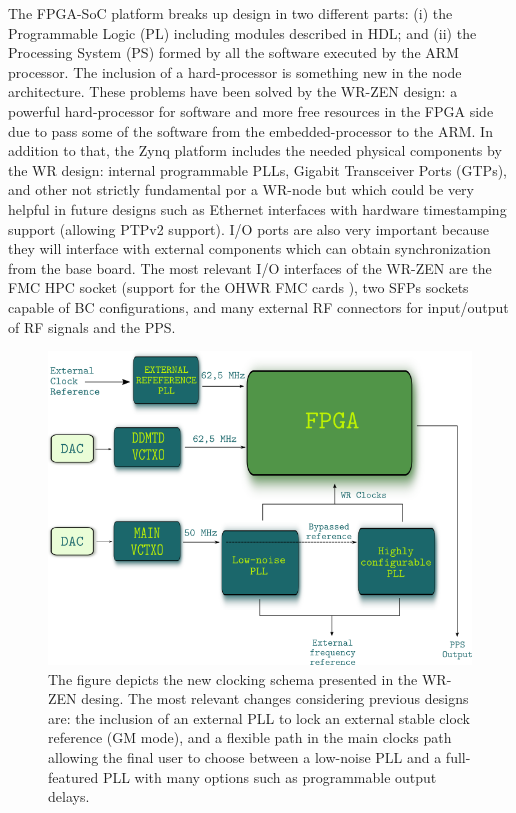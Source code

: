 The FPGA-SoC platform breaks up design in two different parts: (i) the 
Programmable Logic (PL) including modules described in HDL; and (ii) the 
Processing System (PS) formed by all the software executed by the ARM processor.
The inclusion of a hard-processor is something new in the node architecture.
These problems have been solved by the WR-ZEN design: a 
powerful hard-processor for software and more free resources in the FPGA side 
due to pass some of the software from the embedded-processor to the ARM. In 
addition to that, the Zynq platform includes the needed physical components by 
the WR design: internal programmable PLLs, Gigabit Transceiver Ports (GTPs), 
and other not strictly fundamental por a WR-node but which could be very 
helpful in future designs such as Ethernet interfaces with hardware timestamping 
support (allowing PTPv2 support). I/O ports are also very important because 
they will interface with external components which can obtain synchronization 
from the base board. The most relevant I/O interfaces of the WR-ZEN are the FMC 
HPC socket (support for the OHWR \cite{ohwr:repo} FMC cards 
\cite{ohwr:fmc-fine-delay}), two SFPs sockets capable of BC configurations, and 
many external RF connectors for input/output of RF signals and the PPS.

\begin{figure}
	\centering
	\includegraphics[width=0.7\linewidth]{img/zenclkschema}
	\caption[WR-ZEN clocking schema]{The figure depicts the new clocking schema 
		presented in the WR-ZEN desing. The most relevant changes considering 
		previous designs are: the inclusion of an external PLL to lock an 
		external 
		stable clock reference (GM mode), and a flexible path in the 
		main 
		clocks path allowing the final user to choose between a low-noise PLL 
		and a 
		full-featured PLL with many options such as programmable output delays.}
	\label{fig:zenclkschema}
\end{figure}

